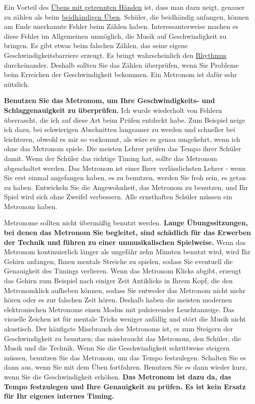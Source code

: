 Ein Vorteil des \hyperlink{c1ii7}{Übens mit getrennten Händen} ist, dass man dazu neigt, genauer zu zählen als beim \hyperlink{c1ii25}{beidhändigen Üben}.
Schüler, die beidhändig anfangen, können am Ende unerkannte Fehler beim Zählen haben.
Interessanterweise machen es diese Fehler im Allgemeinen unmöglich, die Musik auf Geschwindigkeit zu bringen.
Es gibt etwas beim falschen Zählen, das seine eigene Geschwindigkeitsbarriere erzeugt.
Es bringt wahrscheinlich den \hyperlink{c1iii1b}{Rhythmus} durcheinander.
Deshalb sollten Sie das Zählen überprüfen, wenn Sie Probleme beim Erreichen der Geschwindigkeit bekommen.
Ein Metronom ist dafür sehr nützlich.

\textbf{Benutzen Sie das Metronom, um Ihre Geschwindigkeits- und Schlaggenauigkeit zu überprüfen.}
Ich wurde wiederholt von Fehlern überrascht, die ich auf diese Art beim Prüfen entdeckt habe.
Zum Beispiel neige ich dazu, bei schwierigen Abschnitten langsamer zu werden und schneller bei leichteren, obwohl es mir so vorkommt, als wäre es genau umgekehrt, wenn ich ohne das Metronom spiele.
Die meisten Lehrer prüfen das Tempo ihrer Schüler damit.
Wenn der Schüler das richtige Timing hat, sollte das Metronom abgeschaltet werden.
Das Metronom ist einer Ihrer verlässlichsten Lehrer - wenn Sie erst einmal angefangen haben, es zu benutzen, werden Sie froh sein, es getan zu haben.
Entwickeln Sie die Angewohnheit, das Metronom zu benutzen, und Ihr Spiel wird sich ohne Zweifel verbessern.
Alle ernsthaften Schüler müssen ein Metronom haben.

Metronome sollten nicht übermäßig benutzt werden.
\textbf{Lange Übungssitzungen, bei denen das Metronom Sie begleitet, sind schädlich für das Erwerben der Technik und führen zu einer unmusikalischen Spielweise.}
Wenn das Metronom kontinuierlich länger als ungefähr zehn Minuten benutzt wird, wird Ihr Gehirn anfangen, Ihnen mentale Streiche zu spielen, sodass Sie eventuell die Genauigkeit des Timings verlieren.
Wenn das Metronom Klicks abgibt, erzeugt das Gehirn zum Beispiel nach einiger Zeit Antiklicks in Ihrem Kopf, die den Metronomklick aufheben können, sodass Sie entweder das Metronom nicht mehr hören oder es zur falschen Zeit hören.
Deshalb haben die meisten modernen elektronischen Metronome einen Modus mit pulsierender Leuchtanzeige.
Das visuelle Zeichen ist für mentale Tricks weniger anfällig und stört die Musik nicht akustisch.
Der häufigste Missbrauch des Metronoms ist, es zum Steigern der Geschwindigkeit zu benutzen; das missbraucht das Metronom, den Schüler, die Musik und die Technik.
Wenn Sie die Geschwindigkeit schrittweise steigern müssen, benutzen Sie das Metronom, um das Tempo festzulegen.
Schalten Sie es dann aus, wenn Sie mit dem Üben fortfahren.
Benutzen Sie es dann wieder kurz, wenn Sie die Geschwindigkeit erhöhen.
\textbf{Das Metronom ist dazu da, das Tempo festzulegen und Ihre Genauigkeit zu prüfen.
Es ist kein Ersatz für Ihr eigenes internes Timing.}

